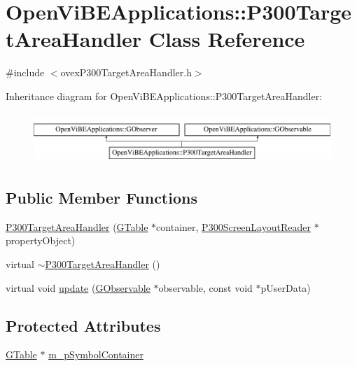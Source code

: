 \hypertarget{classOpenViBEApplications_1_1P300TargetAreaHandler}{
\section{OpenViBEApplications::P300TargetAreaHandler Class Reference}
\label{classOpenViBEApplications_1_1P300TargetAreaHandler}
}


{\ttfamily \#include $<$ovexP300TargetAreaHandler.h$>$}

Inheritance diagram for OpenViBEApplications::P300TargetAreaHandler:\begin{figure}[H]
\begin{center}
\leavevmode
\includegraphics[height=1.917808cm]{classOpenViBEApplications_1_1P300TargetAreaHandler}
\end{center}
\end{figure}
\subsection*{Public Member Functions}
\begin{DoxyCompactItemize}
\item 
\hyperlink{classOpenViBEApplications_1_1P300TargetAreaHandler_ada71a7d22fb1b4931258c2ac5644d029}{P300TargetAreaHandler} (\hyperlink{classOpenViBEApplications_1_1GTable}{GTable} $\ast$container, \hyperlink{classOpenViBEApplications_1_1P300ScreenLayoutReader}{P300ScreenLayoutReader} $\ast$propertyObject)
\item 
virtual \hyperlink{classOpenViBEApplications_1_1P300TargetAreaHandler_ac439791df2fcca9fe2f9a914304b067d}{$\sim$P300TargetAreaHandler} ()
\item 
virtual void \hyperlink{classOpenViBEApplications_1_1P300TargetAreaHandler_a1051e3c5dae865df850c6e82e61a9a8b}{update} (\hyperlink{classOpenViBEApplications_1_1GObservable}{GObservable} $\ast$observable, const void $\ast$pUserData)
\end{DoxyCompactItemize}
\subsection*{Protected Attributes}
\begin{DoxyCompactItemize}
\item 
\hyperlink{classOpenViBEApplications_1_1GTable}{GTable} $\ast$ \hyperlink{classOpenViBEApplications_1_1P300TargetAreaHandler_a255cc9741dac7378d38d9b7df6ce6a7e}{m\_\-pSymbolContainer}
\end{DoxyCompactItemize}
